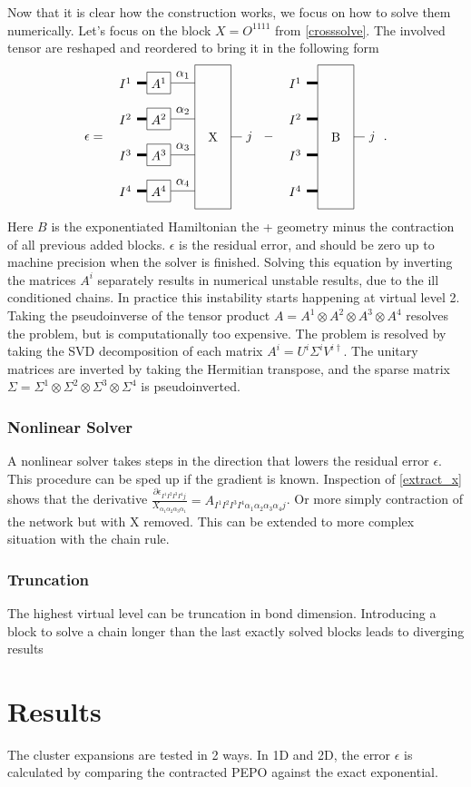 \documentclass[twocolumn]{article}
\newcounter{a}
\newcounter{b}
\begin{document}
Now that it is clear how  the construction works, we focus on how to solve them numerically. Let's focus on the block $X=O^{1 1 1 1}$ from \cref{crosssolve}. The involved tensor are reshaped and reordered to bring it in the following form
\begin{equation}
    \epsilon = \vcenter{\hbox{ \pepoct }} - \vcenter{\hbox{  \blockct }} . \label{extract_x}
\end{equation}
Here $B$ is the exponentiated Hamiltonian the + geometry minus the contraction of all previous added blocks. $\epsilon$ is the residual error, and should be zero up to machine precision when the solver is finished. Solving this equation by inverting the matrices $A^i$ separately results in numerical unstable results, due to the ill conditioned chains. In practice this instability starts happening at virtual level 2. Taking the pseudoinverse of the tensor product  $A = A^1 \otimes A^2 \otimes A^3 \otimes A^4$  resolves the problem, but is  computationally too expensive. The problem is resolved by taking the SVD decomposition of each matrix $A^i = U^i \Sigma^i V^{i \dagger}$. The unitary matrices are inverted by taking the Hermitian transpose, and the sparse matrix $\Sigma = \Sigma^1 \otimes \Sigma^2 \otimes \Sigma^3 \otimes \Sigma^4$ is pseudoinverted.

\subsubsection{Nonlinear Solver}
A nonlinear solver takes steps in the direction that lowers the residual error $\epsilon$. This procedure can be sped up if the gradient is known. Inspection of \cref{extract_x} shows that the derivative  $\frac{\partial  \epsilon_{I^1 I^2 I^3 I^4 j }  }  { X_{\alpha_1 \alpha_2 \alpha_3 \alpha_1 } }   = A_{I^1 I^2 I^3 I^4 \alpha_1 \alpha_2 \alpha_3 \alpha_4 j } $. Or more simply contraction of the network but with X removed. This can be extended to more complex situation with the chain rule.

\subsubsection{Truncation}
The highest virtual level can be truncation in bond dimension. Introducing a block to solve a chain longer than the last exactly solved blocks leads to diverging results

\section{Results}
The cluster expansions are tested in 2 ways. In 1D and 2D, the error $\epsilon$ is calculated by comparing the contracted PEPO against the exact exponential.
\end{document}
